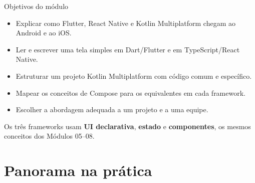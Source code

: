 \documentclass[aspectratio=169,10pt]{beamer}
\begin{document}
\capa

\begin{frame}{Objetivos do módulo}
  \begin{conceito}
    \begin{itemize}
      \item Explicar como Flutter, React Native e Kotlin Multiplatform chegam ao Android e ao iOS.
      \item Ler e escrever uma tela simples em Dart/Flutter e em TypeScript/React Native.
      \item Estruturar um projeto Kotlin Multiplatform com código comum e específico.
      \item Mapear os conceitos de Compose para os equivalentes em cada framework.
      \item Escolher a abordagem adequada a um projeto e a uma equipe.
    \end{itemize}
  \end{conceito}
  \begin{dica}
    Os três frameworks usam \textbf{UI declarativa}, \textbf{estado} e \textbf{componentes}, os mesmos conceitos dos Módulos 05--08.
  \end{dica}
\end{frame}

\sumario



\section{Panorama na prática}
\end{document}
